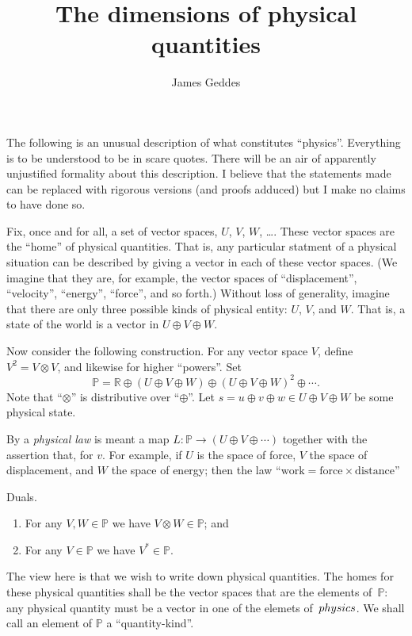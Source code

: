 \documentclass[a4paper, twocolumn, 10pt]{article}
\title{The dimensions of physical quantities}
\author{James Geddes}
\newcommand{\physics}{\mathbb{P}}
\newcommand{\reals}{\mathbb{R}}
\begin{document}
\maketitle

The following is an unusual description of what constitutes
``physics''. Everything is to be understood to be in scare quotes. There will be an
air of apparently unjustified formality about this description. I believe that
the statements made can be replaced with rigorous versions (and proofs adduced)
but I make no claims to have done so.

Fix, once and for all, a set of vector spaces, $U$, $V$, $W$, \ldots. These
vector spaces are the ``home'' of physical quantities. That is, any particular
statment of a physical situation can be described by giving a vector in each of
these vector spaces. (We imagine that they are, for example, the vector spaces
of ``displacement'', ``velocity'', ``energy'', ``force'', and so forth.) Without
loss of generality, imagine that there are only three possible kinds of physical
entity: $U$, $V$, and $W$. That is, a state of the world is a vector in $U\oplus
V\oplus W$.

Now consider the following construction. For any vector space $V$, define
$V^2=V\otimes V$, and likewise for higher ``powers''. Set
\[
\physics = \reals \oplus (U\oplus V\oplus W) \oplus (U\oplus V\oplus W)^2
\oplus \dotsb.
\]
Note that ``$\otimes$'' is distributive over ``$\oplus$''. Let $s= u\oplus
v\oplus w\in U\oplus V\oplus W$ be some physical state.

By a \emph{physical law} is meant a map $L:\physics\to(U\oplus V\oplus\dotsb)$
together with the assertion that, for $v$. For example, if $U$ is the space of
force, $V$ the space of displacement, and $W$ the space of energy; then the law
``$\text{work} = \text{force}\times\text{distance}$''

Duals.


\begin{enumerate}
\item For any $V, W\in\physics$ we have $V\otimes W\in\physics$; and
\item For any $V\in\physics$ we have $V^*\in\physics$.
\end{enumerate}

The view here is that we wish to write down physical quantities. The homes for
these physical quantities shall be the vector spaces that are the elements
of~$\physics$: any physical quantity must be a vector in one of the elemets
of~$\\physics$. We shall call an element of $\physics$ a ``quantity-kind''.
\end{document}
